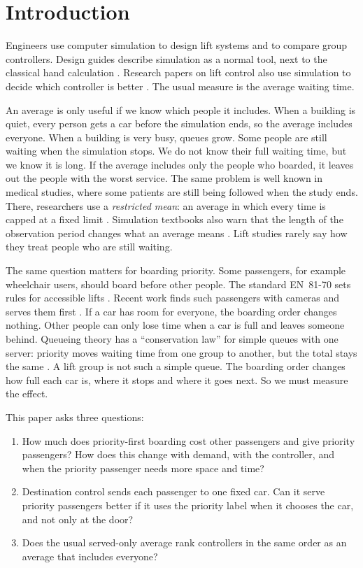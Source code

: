\section{Introduction}\label{sec:intro}

Engineers use computer simulation to design lift systems and to compare group controllers. Design guides describe simulation as a normal tool, next to the classical hand calculation \cite{cibse2025,iso8100,barney2016}. Research papers on lift control also use simulation to decide which controller is better \cite{siikonen1993,kim1995,crites1998,utgoff2012,wan2024}. The usual measure is the average waiting time.

An average is only useful if we know which people it includes. When a building is quiet, every person gets a car before the simulation ends, so the average includes everyone. When a building is very busy, queues grow. Some people are still waiting when the simulation stops. We do not know their full waiting time, but we know it is long. If the average includes only the people who boarded, it leaves out the people with the worst service. The same problem is well known in medical studies, where some patients are still being followed when the study ends. There, researchers use a \emph{restricted mean}: an average in which every time is capped at a fixed limit \cite{royston2013}. Simulation textbooks also warn that the length of the observation period changes what an average means \cite{law2015}. Lift studies rarely say how they treat people who are still waiting.

The same question matters for boarding priority. Some passengers, for example wheelchair users, should board before other people. The standard EN~81-70 sets rules for accessible lifts \cite{en8170}. Recent work finds such passengers with cameras and serves them first \cite{han2024}. If a car has room for everyone, the boarding order changes nothing. Other people can only lose time when a car is full and leaves someone behind. Queueing theory has a ``conservation law'' for simple queues with one server: priority moves waiting time from one group to another, but the total stays the same \cite{kleinrock1965,schrage1970}. A lift group is not such a simple queue. The boarding order changes how full each car is, where it stops and where it goes next. So we must measure the effect.

This paper asks three questions:
\begin{enumerate}[itemsep=2pt]
\item How much does priority-first boarding cost other passengers and give priority passengers? How does this change with demand, with the controller, and when the priority passenger needs more space and time?
\item Destination control sends each passenger to one fixed car. Can it serve priority passengers better if it uses the priority label when it chooses the car, and not only at the door?
\item Does the usual served-only average rank controllers in the same order as an average that includes everyone?
\end{enumerate}

